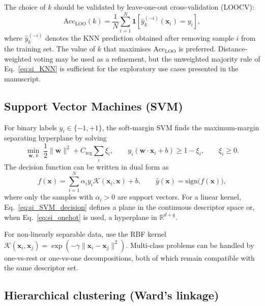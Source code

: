 \documentclass[journal=jacsat,manuscript=article]{achemso}
\begin{document}
The choice of $k$ should be validated by leave-one-out
cross-validation (LOOCV):
\begin{equation}
	\mathrm{Acc}_{\mathrm{LOO}}(k)
	=
	\frac{1}{N}
	\sum_{i=1}^{N}
	\mathbf{1}\!\left[
	\hat{y}^{(-i)}_k(\mathbf{x}_i) = y_i
	\right],
	\label{eq:si_KNN_LOO}
\end{equation}
where $\hat{y}^{(-i)}_k$ denotes the KNN prediction obtained after
removing sample $i$ from the training set. The value of $k$ that
maximises $\mathrm{Acc}_{\mathrm{LOO}}$ is preferred. Distance-weighted
voting may be used as a refinement, but the unweighted majority rule of
Eq.~\eqref{eq:si_KNN} is sufficient for the exploratory use cases
presented in the manuscript.

\subsection{Support Vector Machines (SVM)}
\label{sec:si_SVM}

For binary labels $y_i \in \{-1,+1\}$, the soft-margin SVM finds the
maximum-margin separating hyperplane by solving
\begin{equation}
	\min_{\mathbf{w},\,b}\;
	\frac{1}{2}\|\mathbf{w}\|^2
	+ C_{\mathrm{reg}}\sum_{i}\xi_i,
	\qquad
	y_i(\mathbf{w}\cdot\mathbf{x}_i + b) \ge 1 - \xi_i,
	\qquad
	\xi_i \ge 0.
	\label{eq:si_SVM}
\end{equation}
The decision function can be written in dual form as
\begin{equation}
	f(\mathbf{x})
	=
	\sum_{i=1}^{N}
	\alpha_i y_i \mathcal{K}(\mathbf{x}_i,\mathbf{x})
	+ b,
	\qquad
	\hat{y}(\mathbf{x}) = \mathrm{sign}\!\bigl(f(\mathbf{x})\bigr),
	\label{eq:si_SVM_decision}
\end{equation}
where only the samples with $\alpha_i > 0$ are support vectors. For a
linear kernel, Eq.~\eqref{eq:si_SVM_decision} defines a plane in the
continuous descriptor space or, when Eq.~\eqref{eq:si_onehot} is used, a
hyperplane in $\mathbb{R}^{d+q}$.

For non-linearly separable data, use the RBF kernel
$\mathcal{K}(\mathbf{x}_i, \mathbf{x}_j)
= \exp(-\gamma\|\mathbf{x}_i - \mathbf{x}_j\|^2)$.
Multi-class problems can be handled by one-vs-rest or one-vs-one
decompositions, both of which remain compatible with the same
descriptor set.

\subsection{Hierarchical clustering (Ward's linkage)}
\label{sec:si_Ward}
\end{document}
